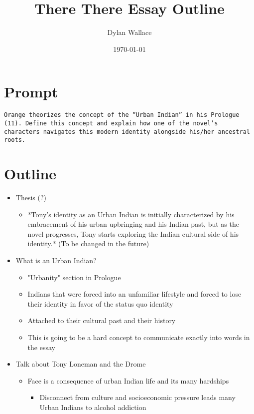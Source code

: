 \documentclass[letterpaper]{article}
\author{Dylan Wallace}
\date{\today}
\title{There There Essay Outline}
\renewcommand{\tableofcontents}{}
\begin{document}
\tableofcontents



\section{Prompt}
\label{sec:org4caa0c5}
\begin{verbatim}
Orange theorizes the concept of the “Urban Indian” in his Prologue (11). Define this concept and explain how one of the novel’s characters navigates this modern identity alongside his/her ancestral roots.
\end{verbatim}

\section{Outline}
\label{sec:org8c303f8}
\begin{itemize}
\item Thesis (?)

\begin{itemize}
\item *Tony's identity as an Urban Indian is initially characterized by
his embracement of his urban upbringing and his Indian past, but as
the novel progresses, Tony starts exploring the Indian cultural side
of his identity.* (To be changed in the future)
\end{itemize}

\item What is an Urban Indian?

\begin{itemize}
\item "Urbanity" section in Prologue
\item Indians that were forced into an unfamiliar lifestyle and forced to
lose their identity in favor of the status quo identity
\item Attached to their cultural past and their history
\item This is going to be a hard concept to communicate exactly into words
in the essay
\end{itemize}

\item Talk about Tony Loneman and the Drome

\begin{itemize}
\item Face is a consequence of urban Indian life and its many hardships

\begin{itemize}
\item Disconnect from culture and socioeconomic pressure leads many
Urban Indians to alcohol addiction
\end{itemize}


\end{itemize}
\end{itemize}
\end{document}

